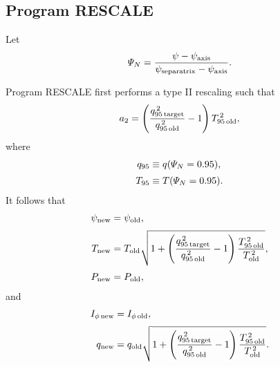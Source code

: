 \documentclass[12pt]{article}
\begin{document}
\subsection{Program {\sc RESCALE}}
Let
\begin{equation}
{\mit\Psi}_N = \frac{\psi - \psi_{\rm axis}}{\psi_{\rm separatrix}-\psi_{\rm axis}}.
\end{equation}

Program {\sc RESCALE} first performs a type II rescaling such that 
\begin{equation}
a_2 = \left(\frac{q_{95\,{\rm target}}^{\,2}}{q_{95\,{\rm old}}^{\,2}}-1\right)T_{95\,{\rm old}}^{\,2},
\end{equation}
where
\begin{align}
q_{95} &\equiv q({\mit\Psi}_N=0.95),\\[0.5ex]
T_{95}&\equiv T({\mit\Psi}_N=0.95).
\end{align}
It follows that
\begin{align}
\psi_{\rm new} &= \psi_{\rm old},\\[0.5ex]
T_{\rm new} & =T_{\rm old}\sqrt{1 +\left(\frac{q_{95\,{\rm target}}^{\,2}}{q_{95\,{\rm old}}^{\,2}}-1\right)\frac{T_{95\,{\rm old}}^{\,2}}{T_{\rm old}^{\,2}}},\\[0.5ex]
P_{\rm new} &= P_{\rm old},
\end{align}
and
\begin{align}
I_{\phi\,{\rm new}} &=I_{\phi\,{\rm old}},\\[0.5ex]
q_{\rm new} &= q_{\rm old}\sqrt{1 +\left(\frac{q_{95\,{\rm target}}^{\,2}}{q_{95\,{\rm old}}^{\,2}}-1\right)\frac{T_{95\,{\rm old}}^{\,2}}{T_{\rm old}^{\,2}}}.
\end{align} 
\end{document}
